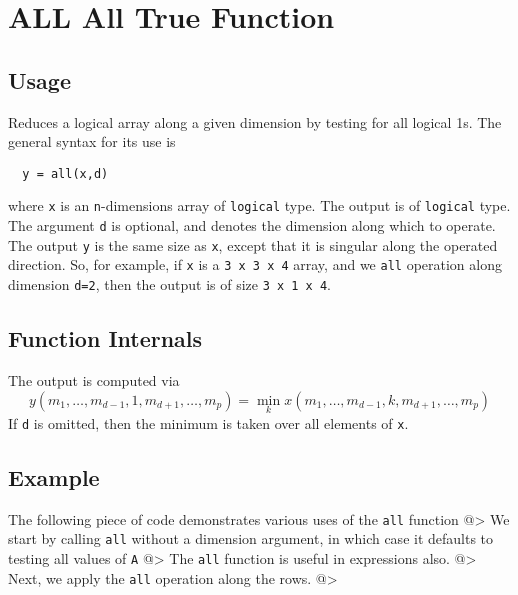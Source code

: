 \section{ALL All True Function}

\subsection{Usage}

Reduces a logical array along a given dimension by testing for all
logical 1s.  The general 
syntax for its use is
\begin{verbatim}
  y = all(x,d)
\end{verbatim}
where \verb|x| is an \verb|n|-dimensions array of \verb|logical| type.
The output is of \verb|logical| type.  The argument \verb|d| is 
optional, and denotes the dimension along which to operate.
The output \verb|y| is the same size as \verb|x|, except that it is 
singular along the operated direction.  So, for example,
if \verb|x| is a \verb|3 x 3 x 4| array, and we \verb|all| operation along
dimension \verb|d=2|, then the output is of size \verb|3 x 1 x 4|.
\subsection{Function Internals}

The output is computed via
\[
y(m_1,\ldots,m_{d-1},1,m_{d+1},\ldots,m_{p}) = 
\min_{k} x(m_1,\ldots,m_{d-1},k,m_{d+1},\ldots,m_{p})
\]
If \verb|d| is omitted, then the minimum is taken over all elements of
\verb|x|.
\subsection{Example}

The following piece of code demonstrates various uses of the \verb|all|
function
@>
We start by calling \verb|all| without a dimension argument, in which 
case it defaults to testing all values of \verb|A|
@>
The \verb|all| function is useful in expressions also.
@>
Next, we apply the \verb|all| operation along the rows.
@>
